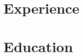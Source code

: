 \documentclass[a4paper,11pt]{article}
\begin{document}
\header%
\section{Experience}
\begin{sectionList}

    \begin{jobReflectizLead}
        \ReffPivotalRole
        \ReffScaling
        \ReffArchitectureList
        \ReffCommunicated
        \ReffObservability
        \ReffAcquisitionClients
        \ReffEmpowered
        \ReffIncidentShort
        \ReffAccelerated
        \ReffDocumentation
    \end{jobReflectizLead}

    \begin{jobAppdome}
        \AppSummaryTechLead
        \AppGuidedDevelopers
        \AppComplexTechnical
        \AppModernizedDevelopmentProcesses
        \AppMajorRefactoring
    \end{jobAppdome}

    \begin{jobReflectizDev}
        \RefDevFoundational
        \RefDevDevelopment
        \RefDevOptimized
    \end{jobReflectizDev}
    \begin{jobEternitech}
        \EtrSPAsForClients
        \EtrMaintainedExistingApps
        \EtrRequirementsAndSpecifications
    \end{jobEternitech}
\end{sectionList}%

\section{Education}
\begin{sectionList}
    \begin{eduTechnion}
    \end{eduTechnion}
\end{sectionList}%
\end{document}
